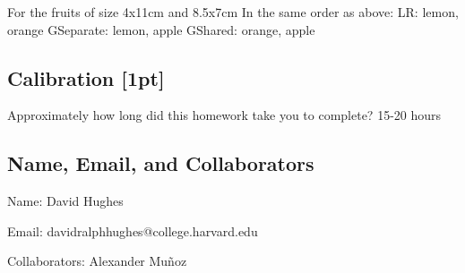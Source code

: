 \documentclass[submit]{harvardml}
\begin{document}
For the fruits of size 4x11cm and 8.5x7cm In the same order as above:
LR: lemon, orange
GSeparate: lemon, apple
GShared: orange, apple

\newpage
\subsection*{Calibration [1pt]}
Approximately how long did this homework take you to complete?
15-20 hours

\subsection*{Name, Email, and Collaborators}

Name: David Hughes

Email: davidralphhughes@college.harvard.edu

Collaborators: Alexander Muñoz
\end{document}
